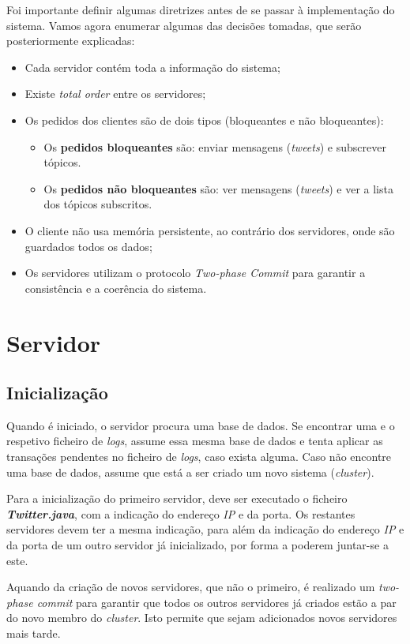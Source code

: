 \documentclass[a4paper]{report}
\begin{document}
	Foi importante definir algumas diretrizes antes de se passar à implementação do sistema. Vamos agora enumerar algumas das decisões tomadas, que serão posteriormente explicadas:
	\begin{itemize}
			\item Cada servidor contém toda a informação do sistema;
			\item Existe \textit{total order} entre os servidores;
			\item Os pedidos dos clientes são de dois tipos (bloqueantes e não bloqueantes):
			\begin{itemize}
				\item Os \textbf{pedidos bloqueantes} são: enviar mensagens (\textit{tweets}) e subscrever tópicos. 
				\item Os \textbf{pedidos não bloqueantes} são: ver mensagens (\textit{tweets}) e ver a lista dos tópicos subscritos.
			\end{itemize}
			\item O cliente não usa memória persistente, ao contrário dos servidores, onde são guardados todos os dados;
			\item Os servidores utilizam o protocolo \textit{Two-phase Commit} para garantir a consistência e a coerência do sistema.
		\end{itemize}

	\section{Servidor}

		\subsection{Inicialização}
		Quando é iniciado, o servidor procura uma base de dados. Se encontrar uma e o respetivo ficheiro de \textit{logs}, assume essa mesma base de dados e tenta aplicar as transações pendentes no ficheiro de \textit{logs}, caso exista alguma.
		Caso não encontre uma base de dados, assume que está a ser criado um novo sistema (\textit{cluster}).

		Para a inicialização do primeiro servidor, deve ser executado o ficheiro \textit{\textbf{Twitter.java}}, com a indicação do endereço \textit{IP} e da porta.
		Os restantes servidores devem ter a mesma indicação, para além da indicação do endereço \textit{IP} e da porta de um outro servidor já inicializado, por forma a poderem juntar-se a este.

		Aquando da criação de novos servidores, que não o primeiro, é realizado um \textit{two-phase commit} para garantir que todos os outros servidores já criados estão a par do novo membro do \textit{cluster}.
		Isto permite que sejam adicionados novos servidores mais tarde.
\end{document}
